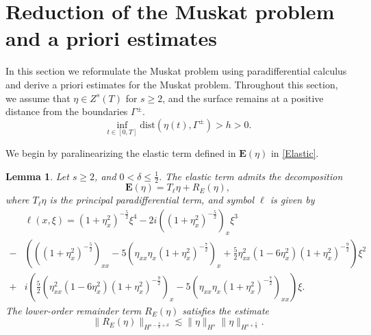 \documentclass[12pt]{amsart}
\newtheorem{lemma}[theorem]{Lemma}
\theoremstyle{definition}
\numberwithin{equation}{section}
\newcommand{\f}{\frac}
\begin{document}
\section{Reduction of the Muskat problem and a priori estimates} \label{s:Reduct}
In this section we reformulate the Muskat problem using paradifferential calculus and derive a priori estimates for the Muskat problem. 
Throughout this section, we assume that $\eta \in Z^s(T)$ for $s\geq2$, and the surface remains at a positive distance from the boundaries $\Gamma^\pm$.
\begin{equation} \label{BottomH}
 \inf_{t\in[0,T]}\text{dist}(\eta(t), \Gamma^\pm)> h>0.
\end{equation}

We begin by paralinearizing the elastic term defined in $\mathbf{E}(\eta)$ in \eqref{Elastic}.
\begin{lemma} 
Let $s\geq2$, and $0<\delta \leq \f12$.
The elastic term admits the decomposition 
\begin{equation} \label{ElasticPara}
  \mathbf{E}(\eta) = T_{\ell} \eta + R_E(\eta),   
\end{equation}
where $ T_{\ell} \eta$ is the principal paradifferential term, and symbol $\ell$ is given by 
\begin{equation} \label{EllDef}
\begin{aligned}
    &\ell(x, \xi) = (1+\eta_x^2)^{-\f52}\xi^4 -2i((1+\eta_x^2)^{-\f52})_x \xi^3 \\
    -& \left(((1+\eta_x^2)^{-\f52})_{xx} -5(\eta_{xx}\eta_x(1+\eta_x^2)^{-\f72})_{x} +\f52\eta_{xx}^2(1-6\eta_x^2)(1+\eta_x^2)^{-\f92}\right) \xi^2 \\
    +& i\left(\f52 (\eta_{xx}^2(1-6\eta_x^2)(1+\eta_x^2)^{-\f92})_x-5(\eta_{xx}\eta_x(1+\eta_x^2)^{-\f72})_{xx}\right)\xi.
\end{aligned}    
\end{equation}
The lower-order remainder term $R_E(\eta)$ satisfies the estimate
\begin{equation} \label{REEtaEst}
    \|R_E(\eta)\|_{H^{s-\f32+\delta}} \lesssim \|\eta\|_{H^s} \|\eta\|_{H^{s+\f52}}. 
\end{equation}
\end{lemma}
\end{document}
